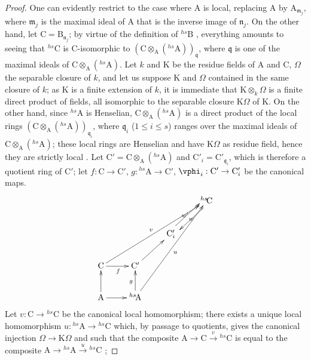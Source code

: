 \begin{proof}
One can evidently restrict to the case where A is local, replacing A by $\mathrm{A}_{\mathfrak{m}_j}$, where $\mathfrak{m}_j$ is the maximal ideal of A that is the inverse image of $\mathfrak{n}_j$.
On the other hand, let $\mathrm{C}=\mathrm{B}_{\mathfrak{n}_j}$;
by virtue of the definition of ${}^{hs}\!\mathrm{B}$ , everything amounts to seeing that ${}^{hs}\!\mathrm{C}$ is C-isomorphic to $(\mathrm{C}\otimes_{\mathrm{A}}({}^{hs}\!\mathrm{A}))_{\mathfrak{q}}$, where $\mathfrak{q}$ is one of the maximal ideals of $\mathrm{C}\otimes_{\mathrm{A}}({}^{hs}\!\mathrm{A})$.
Let $k$ and K be the residue fields of A and C, $\Omega$ the separable closure of $k$, and let us suppose K and $\Omega$ contained in the same closure of $k$;
as K is a finite extension of $k$, it is immediate that $\mathrm{K}\otimes_k\Omega$ is a finite direct product of fields, all isomorphic to the separable closure $\mathrm{K}\Omega$ of K.
On the other hand, since ${}^{hs}\!\mathrm{A}$ is Henselian, $\mathrm{C}\otimes_{\mathrm{A}}({}^{hs}\!\mathrm{A})$ is a direct product of the local rings $(\mathrm{C}\otimes_{\mathrm{A}}({}^{hs}\!\mathrm{A}))_{\mathfrak{q}_i}$, where $\mathfrak{q}_i$ ($1\leq i\leq s$) ranges over the maximal ideals of $\mathrm{C}\otimes_{\mathrm{A}}({}^{hs}\!\mathrm{A})$; these local rings are Henselian  and have $\mathrm{K}\Omega$ as residue field, hence they are strictly local .
Let $\mathrm{C}'=\mathrm{C}\otimes_{\mathrm{A}}({}^{hs}\!\mathrm{A})$ and $\mathrm{C}'_i=\mathrm{C}'_{\mathfrak{q}_i}$, which is therefore a quotient ring of $\mathrm{C}'$;
let $f:\mathrm{C}\to\mathrm{C}'$, $g:{}^{hs}\!\mathrm{A}\to\mathrm{C}'$, $\vphi_i:\mathrm{C}'\to\mathrm{C}'_i$ be the canonical maps.
\[
  \xymatrix{
    &&& {}^{hs}\!\mathrm{C} \ar@<0.8ex>[dl]_{w'} \\
    && \mathrm{C}'_i \ar@<0.8ex>[ur]_{w} \\
    \mathrm{C} \ar[uurrr]^{v} \ar[r]_{f} & \mathrm{C}' \ar[ur] \\
    \mathrm{A} \ar[u] \ar[r] & {}^{hs}\!\mathrm{A} \ar[u]^{g} \ar[uuurr]_{u}
  }
\]
Let $v:\mathrm{C}\to{}^{hs}\!\mathrm{C}$ be the canonical local homomorphism;
there exists a unique local homomorphism $u:{}^{hs}\!\mathrm{A}\to{}^{hs}\!\mathrm{C}$ which, by passage to quotients, gives the canonical injection $\Omega\to\mathrm{K}\Omega$ and such that the composite $\mathrm{A}\to\mathrm{C}\xrightarrow{v}{}^{hs}\!\mathrm{C}$ is equal to the composite $\mathrm{A}\to{}^{hs}\!\mathrm{A}\xrightarrow{u}{}^{hs}\!\mathrm{C}$ ;

\end{proof}

